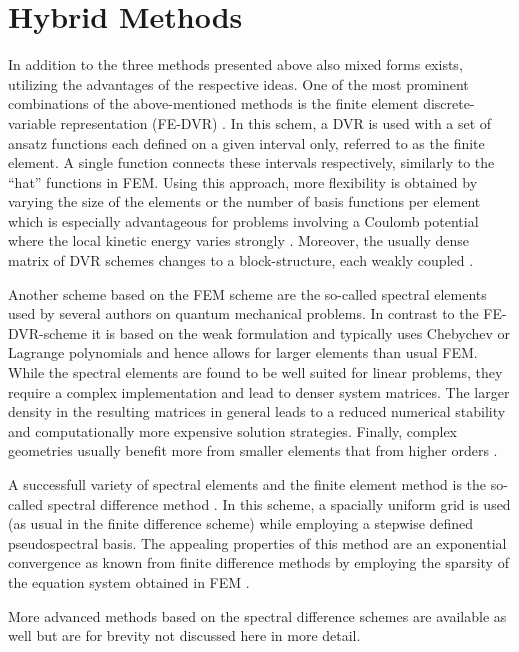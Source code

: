 {\section{Hybrid Methods}
In addition to the three methods presented above also mixed forms exists, utilizing the advantages of the respective ideas.
One of the most prominent combinations of the above-mentioned methods is the finite element discrete-variable representation (FE-DVR) \cite{impLDVR,taoDVR}.
In this schem, a DVR is used with a set of ansatz functions each defined on a given interval only, referred to as the finite element.
A single function connects these intervals respectively, similarly to the ``hat'' functions in FEM.
Using this approach, more flexibility is obtained by varying the size of the elements or the number of basis functions per element which is especially advantageous for problems involving a Coulomb potential where the local kinetic energy varies strongly \cite{yipDVR}.
Moreover, the usually dense matrix of DVR schemes changes to a block-structure, each weakly coupled \cite{taoDVR}.

Another scheme based on the FEM scheme are the so-called spectral elements \cite{sem1,sem2,sem3} used by several authors on quantum mechanical problems.
In contrast to the FE-DVR-scheme it is based on the weak formulation and typically uses Chebychev or Lagrange polynomials \cite{sem1} and hence allows for larger elements than usual FEM.
While the spectral elements are found to be well suited for linear problems, they require a complex implementation and lead to denser system matrices.
The larger density in the resulting matrices in general leads to a reduced numerical stability and computationally more expensive solution strategies.
Finally, complex geometries usually benefit more from smaller elements that from higher orders \cite{hf_dreyer}.

A successfull variety of spectral elements and the finite element method is the so-called spectral difference method \cite{SpectDiff,sd_mult}.
In this scheme, a spacially uniform grid is used (as usual in the finite difference scheme) while employing a stepwise defined pseudospectral basis.
The appealing properties of this method are an exponential convergence as known from finite difference methods by employing the sparsity of the equation system obtained in FEM \cite{SpectDiff}.

More advanced methods based on the spectral difference schemes are available as well \cite{sd_mult,sd_unstructured} but are for brevity not discussed here in more detail.

}
